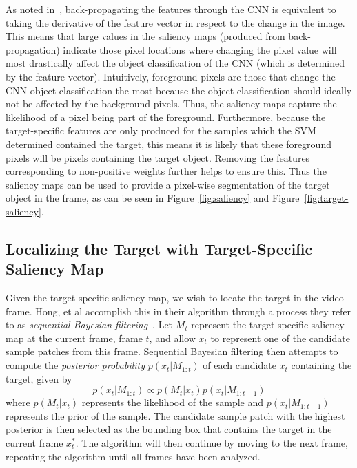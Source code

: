 \documentclass{sig-alternate-05-2015}
\begin{document}
As noted in~\cite{hong2015online}, back-propagating the features through the CNN is equivalent to taking the derivative of the feature vector in respect to the change in the image.
This means that large values in the saliency maps (produced from back-propagation) indicate those pixel locations where changing the pixel value will most drastically affect the object classification of the CNN (which is determined by the feature vector).
Intuitively, foreground pixels are those that change the CNN object classification the most because the object classification should ideally not be affected by the background pixels.
Thus, the saliency maps capture the likelihood of a pixel being part of the foreground.
Furthermore, because the target-specific features are only produced for the samples which the SVM determined contained the target, this means it is likely that these foreground pixels will be pixels containing the target object.
Removing the features corresponding to non-positive weights further helps to ensure this.
Thus the saliency maps can be used to provide a pixel-wise segmentation of the target object in the frame, as can be seen in Figure~\ref{fig:saliency} and Figure~\ref{fig:target-saliency}.

\subsection{Localizing the Target with Target-Specific Saliency Map}
Given the target-specific saliency map, we wish to locate the target in the video frame.
Hong, et al accomplish this in their algorithm through a process they refer to as \textit{sequential Bayesian filtering}~\cite{hong2015online}.
Let $M_t$ represent the target-specific saliency map at the current frame, frame $t$, and allow $x_t$ to represent one of the candidate sample patches from this frame.
Sequential Bayesian filtering then attempts to compute the \textit{posterior probability} $p(x_t|M_{1:t})$ of each candidate $x_t$ containing the target, given by
\begin{equation}
\label{eq:posterior}
p(x_t|M_{1:t}) \propto p(M_t |x_t)p(x_t|M_{1:t-1})
\end{equation}
where $p(M_t |x_t)$ represents the likelihood of the sample and $p(x_t|M_{1:t-1})$ represents the prior of the sample.
The candidate sample patch with the highest posterior is then selected as the bounding box that contains the target in the current frame $x_t^*$.
The algorithm will then continue by moving to the next frame, repeating the algorithm until all frames have been analyzed.
\end{document}
